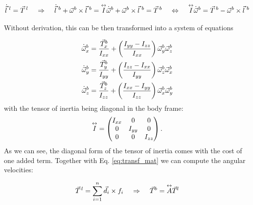  $$
\dot{\vec{l}}^{\,\,l} = \vec{T}^{\,l} 
\hspace{0.4cm} \Rightarrow \hspace{0.4cm}
\dot{\vec{l}}^{\,\,b} + \vec{\omega}^b\times\vec{l}^{\,\,b} = \overset{\leftrightarrow}{I} \dot{\vec{\omega}}^b + \vec{\omega}^b \times \vec{l}^{\,\,b} = \vec{T}^{\,b}
\hspace{0.4cm} \Leftrightarrow \hspace{0.4cm}
\overset{\leftrightarrow}{I} \dot{\vec{\omega}}^b  = \vec{T}^{\,b} - \vec{\omega}^b \times \vec{l}^{\,\,b}
$$

Without derivation, this can be then transformed into a system of equations

\begin{align}
\dot{\vec{\omega}}_x^b &= \frac{\vec{T}^b_x}{I_{xx}} + \left(\frac{{I}_{yy}-{I}_{zz}}{{I}_{xx}}   \right) \vec{\omega}^b_y\vec{\omega}^b_z \\
\dot{\vec{\omega}}_y^b &= \frac{\vec{T}^b_y}{I_{yy}} + \left(\frac{{I}_{zz}-{I}_{xx}}{{I}_{yy}}   \right) \vec{\omega}^b_z\vec{\omega}^b_x \\
\dot{\vec{\omega}}_z^b &= \frac{\vec{T}^b_z}{I_{zz}} + \left(  \frac{{I}_{xx}-{I}_{yy}}{{I}_{zz}}   \right) \vec{\omega}^b_x\vec{\omega}^b_y
\end{align}
with the tensor of inertia being diagonal in the body frame: 
$$\overset{\leftrightarrow}{I} = \begin{pmatrix}
 I_{xx} & 0 & 0\\
 0 & I_{yy} & 0 \\
 0 & 0 & I_{zz}  
\end{pmatrix}. $$ 
As we can see, the diagonal form of the tensor of inertia comes with the cost of one added term. Together with Eq. \eqref{eq:transf_mat} we can compute the angular velocities:

$$
\vec{T}^{\,l} = \sum_{i=1}^n   {\vec{d}_i \times f_i} 
\hspace{0.4cm} \Rightarrow \hspace{0.4cm}
\vec{T}^b = \overset{\leftrightarrow}{A}\vec{T}^l
$$


